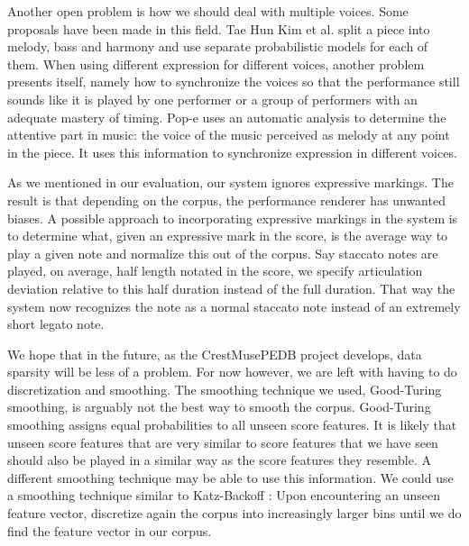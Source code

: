 \documentclass[a4paper,10pt]{article}
\begin{document}
Another open problem is how we should deal with multiple voices. Some proposals have been made in this field. Tae Hun Kim et al. \cite{kim2010performance} split a piece into melody, bass and harmony and use separate probabilistic models for each of them. When using different expression for different voices, another problem presents itself, namely how to synchronize the voices so that the performance still sounds like it is played by one performer or a group of performers with an adequate mastery of timing. Pop-e \cite{hashida2006pop} uses an automatic analysis to determine the attentive part in music: the voice of the music perceived as melody at any point in the piece. It uses this information to synchronize expression in different voices.

As we mentioned in our evaluation, our system ignores expressive markings. The result is that depending on the corpus, the performance renderer has unwanted biases. A possible approach to incorporating expressive markings in the system is to determine what, given an expressive mark in the score, is the average way to play a given note and normalize this out of the corpus. Say staccato notes are played, on average, half length notated in the score, we specify articulation deviation relative to this half duration instead of the full duration. That way the system now recognizes the note as a normal staccato note instead of an extremely short legato note. 

We hope that in the future, as the CrestMusePEDB project develops, data sparsity will be less of a problem. For now however, we are left with having to do discretization and smoothing. The smoothing technique we used, Good-Turing smoothing, is arguably not the best way to smooth the corpus. Good-Turing smoothing assigns equal probabilities to all unseen score features. It is likely that unseen score features that are very similar to score features that we have seen should also be played in a similar way as the score features they resemble. A different smoothing technique may be able to use this information. We could use a smoothing technique similar to Katz-Backoff \cite{katz1987estimation}: Upon encountering an unseen feature vector, discretize again the corpus into increasingly larger bins until we do find the feature vector in our corpus.

\end{document}
